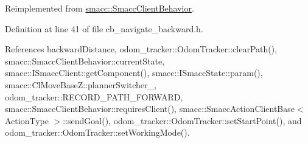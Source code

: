 Reimplemented from \hyperlink{classsmacc_1_1SmaccClientBehavior_a7962382f93987c720ad432fef55b123f}{smacc\+::\+Smacc\+Client\+Behavior}.



Definition at line 41 of file cb\+\_\+navigate\+\_\+backward.\+h.



References backward\+Distance, odom\+\_\+tracker\+::\+Odom\+Tracker\+::clear\+Path(), smacc\+::\+Smacc\+Client\+Behavior\+::current\+State, smacc\+::\+I\+Smacc\+Client\+::get\+Component(), smacc\+::\+I\+Smacc\+State\+::param(), smacc\+::\+Cl\+Move\+Base\+Z\+::planner\+Switcher\+\_\+, odom\+\_\+tracker\+::\+R\+E\+C\+O\+R\+D\+\_\+\+P\+A\+T\+H\+\_\+\+F\+O\+R\+W\+A\+RD, smacc\+::\+Smacc\+Client\+Behavior\+::requires\+Client(), smacc\+::\+Smacc\+Action\+Client\+Base$<$ Action\+Type $>$\+::send\+Goal(), odom\+\_\+tracker\+::\+Odom\+Tracker\+::set\+Start\+Point(), and odom\+\_\+tracker\+::\+Odom\+Tracker\+::set\+Working\+Mode().



